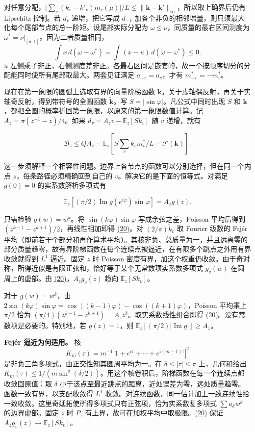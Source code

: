 \documentclass[11pt,a4paper]{article}
\begin{document}
对任意分配，\(\big|\sum_v(k_v-k'_v)m_v(\mu)\big|/L\le\|\mathbf k-\mathbf k'\|_\infty\)，所以取上确界后仍有 Lipschitz 控制。若 \(d_v\) 递增，把它写成 \(d_{-V}\) 加各个非负的相邻增量，则只须最大化每个尾部节点的总一阶矩。设尾部实际分配为 \(\omega\le\nu\)，同质量的最右区间测度为 \(\omega^*=\nu|_{[u,1]}\)。因为二者质量相同， \[
 \int x\,d(\omega-\omega^*)=\int(x-u)\,d(\omega-\omega^*)\le0 .
\] \(u\) 左侧乘子非正，右侧测度差非正。各最右区间是嵌套的，故一个按顺序切分的分配能同时使所有尾部取最大。两套见证满足 \(a_{-v}=a_v\)，才有 \(m_{-v}^*=-m_v^*\)。

现在在第一象限的圆弧上选取有界的向量阶梯函数 \(\mathbf k\)。关于虚轴偶反射，再关于实轴奇反射，得到带符号的全圆函数 \(\widetilde{\mathbf k}\)。写 \(S=|\sin\varphi|\)。凡公式中同时出现 \(S\) 和 \(\mathbf k\)，都把全圆的概率折回第一象限，以原来的第一象限数值计算。记 \(A_z=\pi(z^{-1}-z)/4\)。如果 \(d_v=A_zv-\mathbb E_z[Sk_v]\) 随 \(v\) 递增，就有

\[
 \mathcal B_z\le Q A_z-
 \mathbb E_z\left[S\sum_v k_v m_v^*/L-\mathcal F(\mathbf k)\right].       \tag{19}\label{eq:19}
\]

这一步须解释一个相容性问题。边界上各节点的函数可以分别选择，但在同一个内点 \(z\)，每条路径必须精确回到自己的 \(v\)。解决它的是下面的恒等式。对满足 \(g(0)=0\) 的实系数解析多项式有

\[
 \mathbb E_z[(\pi/2)\operatorname{Im}g(e^{i\varphi})\sin\varphi]=A_zg(z).
                                                                            \tag{20}\label{eq:20}
\]

只需检验 \(g(w)=w^k\)。将 \(\sin(k\varphi)\sin\varphi\) 写成余弦之差，Poisson 平均后得到 \((z^{k-1}-z^{k+1})/2\)，再线性相加即得 \hyperref[eq:20]{(20)}。对 \((2/\pi)\widetilde k_v\) 取 Fourier 级数的 Fejér 平均（即前若干个部分和再作算术平均）。其核非负、总质量为一，并且远离零的部分质量趋零，故有界阶梯函数在每个连续点被逼近，在有限多个跳点之外用有界收敛就得到 \(L^1\) 逼近。固定 \(z\) 时 Poisson 密度有界，加这个权重仍收敛。由于奇对称，所得近似是有限正弦和，恰好等于某个无常数项实系数多项式 \(g_v(w)\) 在圆周上的虚部。由 \hyperref[eq:20]{(20)}，\(A_zg_v(z)\) 趋向 \(\mathbb E_z[Sk_v]\)。

对于 \(g(w)=w^k\)，由 \(2\sin(k\varphi)\sin\varphi=\cos((k-1)\varphi)-\cos((k+1)\varphi)\)，Poisson 平均乘上 \(\pi/2\) 恰为 \((\pi/4)(z^{k-1}-z^{k+1})=A_z z^k\)。取实系数线性组合即得 \hyperref[eq:20]{(20)}。没有常数项是必要的。特别地，若 \(g(z)=1\)，则 \(\mathbb E_z[(\pi/2)|\operatorname{Im}g|]\ge A_z\)。

\textbf{Fejér 逼近为何适用。} 核 \[
 K_m(\tau)=m^{-1}|1+e^{i\tau}+\cdots+e^{i(m-1)\tau}|^2
\] 是非负三角多项式，由正交性知其圆周平均为一。在 \(\delta\le|\tau|\le\pi\) 上，几何和给出 \(K_m(\tau)\le1/(m\sin^2(\delta/2))\)。用这个核卷积后，阶梯函数在每一个连续点都收敛回原值：取 \(\delta\) 小于该点至最近跳点的距离，近处误差为零，远处质量趋零。函数一致有界，以支配收敛得 \(L^1\) 收敛。对连续函数，同一估计加上一致连续性给一致收敛。这里奇延拓使所得多项式只有正弦项，恰为实系数复多项式 \(\sum a_kw^k\) 的边界虚部。固定 \(z\) 时 \(P_z\) 有上界，故可在加权平均中取极限。\hyperref[eq:20]{(20)} 保证 \(A_zg_v(z)\to\mathbb E_z[Sk_v]\)。
\end{document}
